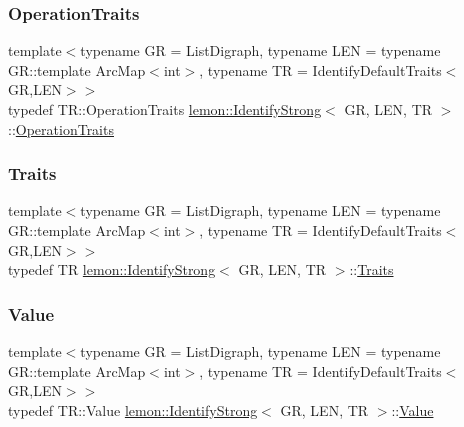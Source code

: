 \mbox{\label{classlemon_1_1_identify_strong_a269ce377a01e3c77e1faf0f392751daa}} 
\subsubsection{\texorpdfstring{Operation\+Traits}{OperationTraits}}
{\footnotesize\ttfamily template$<$typename GR  = List\+Digraph, typename L\+EN  = typename G\+R\+::template Arc\+Map$<$int$>$, typename TR  = Identify\+Default\+Traits$<$\+G\+R,\+L\+E\+N$>$$>$ \\
typedef T\+R\+::\+Operation\+Traits \hyperlink{classlemon_1_1_identify_strong}{lemon\+::\+Identify\+Strong}$<$ GR, L\+EN, TR $>$\+::\hyperlink{classlemon_1_1_identify_strong_a269ce377a01e3c77e1faf0f392751daa}{Operation\+Traits}}

\mbox{\label{classlemon_1_1_identify_strong_a5cac33fc931f82c461d98ca0c16461b7}} 
\subsubsection{\texorpdfstring{Traits}{Traits}}
{\footnotesize\ttfamily template$<$typename GR  = List\+Digraph, typename L\+EN  = typename G\+R\+::template Arc\+Map$<$int$>$, typename TR  = Identify\+Default\+Traits$<$\+G\+R,\+L\+E\+N$>$$>$ \\
typedef TR \hyperlink{classlemon_1_1_identify_strong}{lemon\+::\+Identify\+Strong}$<$ GR, L\+EN, TR $>$\+::\hyperlink{classlemon_1_1_identify_strong_a5cac33fc931f82c461d98ca0c16461b7}{Traits}}

\mbox{\label{classlemon_1_1_identify_strong_a4f6932769928658e75abf819f960e6f1}} 
\subsubsection{\texorpdfstring{Value}{Value}}
{\footnotesize\ttfamily template$<$typename GR  = List\+Digraph, typename L\+EN  = typename G\+R\+::template Arc\+Map$<$int$>$, typename TR  = Identify\+Default\+Traits$<$\+G\+R,\+L\+E\+N$>$$>$ \\
typedef T\+R\+::\+Value \hyperlink{classlemon_1_1_identify_strong}{lemon\+::\+Identify\+Strong}$<$ GR, L\+EN, TR $>$\+::\hyperlink{classlemon_1_1_identify_strong_a4f6932769928658e75abf819f960e6f1}{Value}}



